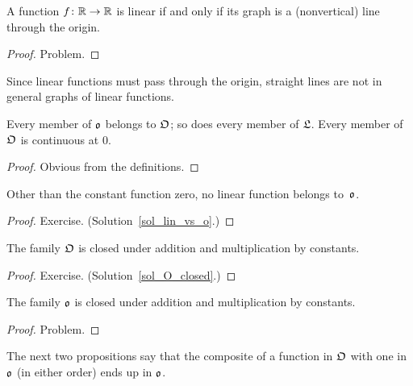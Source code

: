 \begin{exam}\label{lin_R} A function $f \colon \mathbb{R} \rightarrow \mathbb{R}$ is linear if and only if its graph is a
(nonvertical) line through the origin.
\end{exam}

\begin{proof} Problem. \ns \end{proof}

\begin{cau} Since linear functions must pass through the origin, straight lines are not in
general graphs of linear functions.
\end{cau}

\begin{prop}\label{o_in_O} Every member of $\mathfrak{o}$ belongs to $\mathfrak{O}$; so does every member
of $\mathfrak{L}$. Every member of $\mathfrak{O}$ is continuous at 0.
\end{prop}

\begin{proof} Obvious from the definitions.
\end{proof}

\begin{prop}\label{lin_vs_o} Other than the constant function zero, no linear function belongs to~$\mathfrak{o}$.
\end{prop}

\begin{proof} Exercise.  (Solution~\ref{sol_lin_vs_o}.)   \ns \end{proof}

\begin{prop}\label{O_closed} The family $\mathfrak{O}$ is closed under addition and multiplication
by constants.
\end{prop}

\begin{proof} Exercise.   (Solution~\ref{sol_O_closed}.)  \ns \end{proof}

\begin{prop}\label{o_closed} The family $\mathfrak{o}$ is closed under addition and multiplication
by constants.
\end{prop}

\begin{proof} Problem. \ns \end{proof}

The next two propositions say that the composite of a function in $\mathfrak{O}$ with one in $\mathfrak{o}$ (in either order) ends up in $\mathfrak{o}$.

